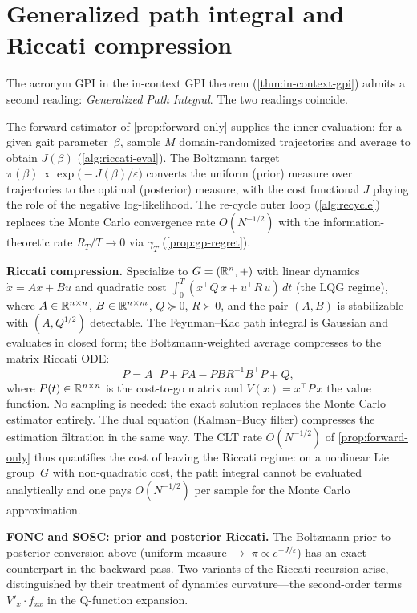 \section{Generalized path integral and Riccati compression}\label{sec:riccati}

\begin{remark}
The acronym GPI in the in-context GPI theorem (\cref{thm:in-context-gpi}) admits a second reading:
\emph{Generalized Path Integral}.
The two readings coincide.

The forward estimator of \cref{prop:forward-only} supplies the
inner evaluation: for a given gait parameter~$\beta$, sample $M$
domain-randomized trajectories and average to obtain $J(\beta)$
(\cref{alg:riccati-eval}).
The Boltzmann target
$\pi(\beta) \propto \exp\!\bigl(-J(\beta)/\varepsilon\bigr)$
converts the uniform (prior) measure over trajectories to the
optimal (posterior) measure, with the cost functional $J$
playing the role of the negative log-likelihood.
The re-cycle outer loop (\cref{alg:recycle}) replaces the
Monte Carlo convergence rate $O(N^{-1/2})$ with the
information-theoretic rate $R_T/T \to 0$ via
$\gamma_T$ (\cref{prop:gp-regret}).

\medskip\noindent\textbf{Riccati compression.}
Specialize to $G = (\mathbb{R}^n, +)$ with linear dynamics
$\dot x = Ax + Bu$ and quadratic cost
$\int_0^T (x^\top Q\,x + u^\top R\,u)\,dt$
(the LQG regime),
where $A \in \mathbb{R}^{n \times n}$, $B \in \mathbb{R}^{n \times m}$,
$Q \succeq 0$, $R \succ 0$, and the pair $(A, B)$ is stabilizable
with $(A, Q^{1/2})$ detectable.
The Feynman--Kac path integral is Gaussian and evaluates in closed
form; the Boltzmann-weighted average compresses to the matrix Riccati
ODE:
\[
\dot P = A^\top\! P + PA - PBR^{-1}B^\top\! P + Q,
\]
where $P(t) \in \mathbb{R}^{n \times n}$ is the cost-to-go matrix and
$V(x) = x^\top P\, x$ the value function.
No sampling is needed: the exact solution replaces the Monte Carlo
estimator entirely.
The dual equation (Kalman--Bucy filter) compresses the estimation
filtration in the same way.
The CLT rate $O(N^{-1/2})$ of \cref{prop:forward-only} thus quantifies
the cost of leaving the Riccati regime: on a nonlinear Lie group~$G$
with non-quadratic cost, the path integral cannot be evaluated
analytically and one pays $O(N^{-1/2})$ per sample for the Monte Carlo
approximation.
\end{remark}

\medskip\noindent\textbf{FONC and SOSC: prior and posterior Riccati.}
The Boltzmann prior-to-posterior conversion above
(uniform measure $\to$ $\pi \propto e^{-J/\varepsilon}$)
has an exact counterpart in the backward pass.
Two variants of the Riccati recursion arise, distinguished by
their treatment of dynamics curvature---the second-order terms
$V'_x \cdot f_{xx}$ in the Q-function expansion.

